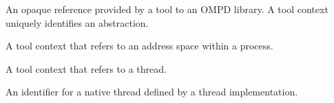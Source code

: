\glossarydefstart
An opaque reference provided by a tool to an OMPD library. A tool context uniquely identifies an abstraction.
\glossarydefend

\glossarydefstart
A tool context that refers to an address space within a process.
\glossarydefend

\glossarydefstart
A tool context that refers to a thread.
\glossarydefend

\glossarydefstart
An identifier for a native thread defined by a thread implementation.
\glossarydefend

